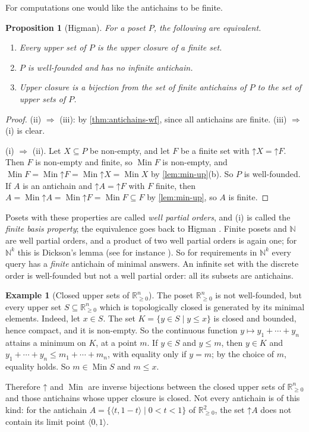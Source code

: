 \documentclass[11pt,a4paper]{article}
\theoremstyle{plain}
\newtheorem{proposition}[theorem]{Proposition}
\theoremstyle{definition}
\newtheorem{example}[theorem]{Example}
\theoremstyle{remark}
\newcommand{\tup}[1]{\langle #1 \rangle}
\newcommand{\up}{\mathord{\uparrow}}
\DeclareMathOperator{\Min}{Min}
\newcommand{\N}{\mathbb{N}}
\newcommand{\Rp}{\mathbb{R}_{\geq 0}}
\begin{document}
For computations one would like the antichains to be finite.

\begin{proposition}[Higman]
    \label{prop:wpo}
    For a poset $P$, the following are equivalent.
    \begin{enumerate}[label=(\roman*)]
        \item Every upper set of $P$ is the upper closure of a finite set.
        \item $P$ is well-founded and has no infinite antichain.
        \item Upper closure is a bijection from the set of \emph{finite} antichains of $P$ to the set of upper sets of $P$.
    \end{enumerate}
\end{proposition}
\begin{proof}
    (ii) $\Rightarrow$ (iii): by \cref{thm:antichains-wf}, since all antichains are finite.
    (iii) $\Rightarrow$ (i) is clear.

    (i) $\Rightarrow$ (ii).
    Let $X \subseteq P$ be non-empty, and let $F$ be a finite set with $\up X = \up F$.
    Then $F$ is non-empty and finite, so $\Min F$ is non-empty, and $\Min F = \Min \up F = \Min \up X = \Min X$ by \cref{lem:min-up}(b).
    So $P$ is well-founded.
    If $A$ is an antichain and $\up A = \up F$ with $F$ finite, then $A = \Min \up A = \Min \up F = \Min F \subseteq F$ by \cref{lem:min-up}, so $A$ is finite.
\end{proof}

Posets with these properties are called \emph{well partial orders}, and (i) is called the \emph{finite basis property}; the equivalence goes back to Higman \cite{higman}.
Finite posets and $\N$ are well partial orders, and a product of two well partial orders is again one; for $\N^k$ this is Dickson's lemma (see for instance \cite{dickson-survey}).
So for requirements in $\N^k$ every query has a \emph{finite} antichain of minimal answers.
An infinite set with the discrete order is well-founded but not a well partial order: all its subsets are antichains.

\begin{example}[Closed upper sets of $\Rp^n$]
    \label{exa:closed-upper-sets}
    The poset $\Rp^n$ is not well-founded, but every upper set $S \subseteq \Rp^n$ which is topologically closed is generated by its minimal elements.
    Indeed, let $x \in S$.
    The set $K = \{ y \in S \mid y \leq x \}$ is closed and bounded, hence compact, and it is non-empty.
    So the continuous function $y \mapsto y_1 + \cdots + y_n$ attains a minimum on $K$, at a point $m$.
    If $y \in S$ and $y \leq m$, then $y \in K$ and $y_1 + \cdots + y_n \leq m_1 + \cdots + m_n$, with equality only if $y = m$; by the choice of $m$, equality holds.
    So $m \in \Min S$ and $m \leq x$.

    Therefore $\up$ and $\Min$ are inverse bijections between the closed upper sets of $\Rp^n$ and those antichains whose upper closure is closed.
    Not every antichain is of this kind: for the antichain $A = \{ \tup{t, 1-t} \mid 0 < t < 1 \}$ of $\Rp^2$, the set $\up A$ does not contain its limit point $\tup{0,1}$.
\end{example}
\end{document}
